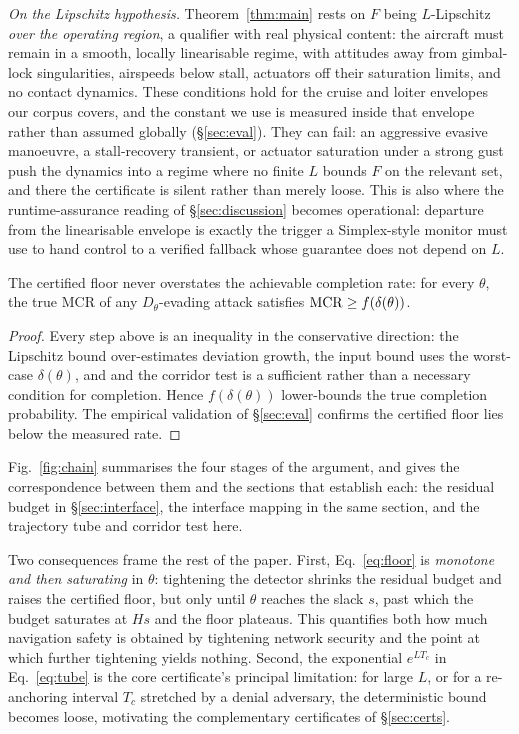 \emph{On the Lipschitz hypothesis.} Theorem~\ref{thm:main} rests on $F$ being
$L$-Lipschitz \emph{over the operating region}, a qualifier with real physical
content: the aircraft must remain in a smooth, locally linearisable regime, with
attitudes away from gimbal-lock singularities, airspeeds below stall, actuators
off their saturation limits, and no contact dynamics. These conditions hold for
the cruise and loiter envelopes our corpus covers, and the constant we use is
measured inside that envelope rather than assumed globally (\S\ref{sec:eval}).
They can fail: an aggressive evasive manoeuvre, a stall-recovery transient, or
actuator saturation under a strong gust push the dynamics into a regime where no
finite $L$ bounds $F$ on the relevant set, and there the certificate is silent
rather than merely loose. This is also where the runtime-assurance reading of
\S\ref{sec:discussion} becomes operational: departure from the linearisable
envelope is exactly the trigger a Simplex-style monitor must use to hand control
to a verified fallback whose guarantee does not depend on $L$.

\begin{proposition}[Soundness]
\label{prop:sound}
The certified floor never overstates the achievable completion rate: for every
$\theta$, the true MCR of any $D_\theta$-evading attack satisfies
$\mathrm{MCR}\ge f(\delta(\theta))$.
\end{proposition}
\begin{proof}
Every step above is an inequality in the conservative direction: the Lipschitz
bound over-estimates deviation growth, the input bound uses the worst-case
$\delta(\theta)$, and and the corridor test is a sufficient rather than a necessary condition for
completion. Hence $f(\delta(\theta))$ lower-bounds the
true completion probability. The empirical validation of \S\ref{sec:eval}
confirms the certified floor lies below the measured rate.
\end{proof}

Fig.~\ref{fig:chain} summarises the four stages of the argument, and gives the
correspondence between them and the sections that establish each: the residual
budget in \S\ref{sec:interface}, the interface mapping in the same section, and
the trajectory tube and corridor test here.

Two consequences frame the rest of the paper. First, Eq.~\eqref{eq:floor} is
\emph{monotone and then saturating} in $\theta$: tightening the detector shrinks
the residual budget and raises the certified floor, but only until $\theta$
reaches the slack $s$, past which the budget saturates at $Hs$ and the floor
plateaus. This quantifies both how much navigation safety is obtained by
tightening network security and the point at which further tightening yields
nothing. Second, the exponential
$e^{LT_c}$ in Eq.~\eqref{eq:tube} is the core certificate's principal
limitation: for large $L$, or for a re-anchoring interval $T_c$ stretched by a
denial adversary, the deterministic bound becomes loose, motivating the
complementary certificates of \S\ref{sec:certs}.

